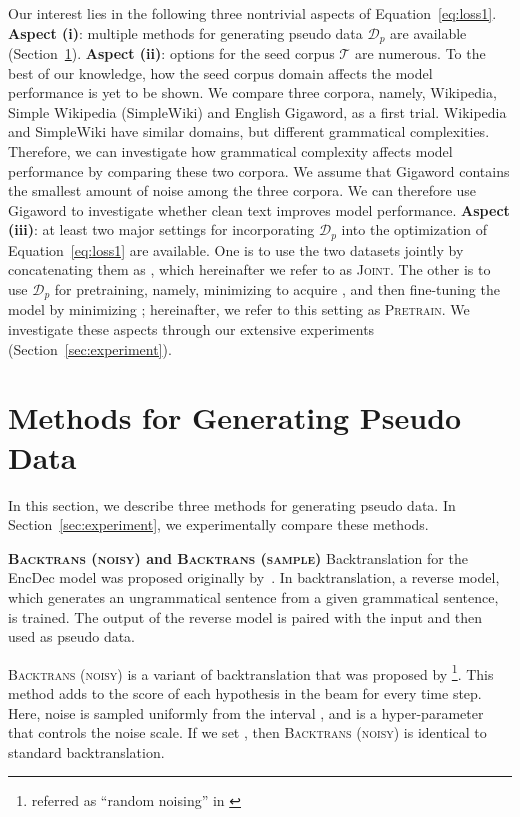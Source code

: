 \documentclass[11pt,a4paper]{article}
\newcommand{\backtrans}{\textsc{Backtrans (noisy)}}
\newcommand{\samplebacktrans}{\textsc{Backtrans (sample)}}
\newcommand{\joint}{\textsc{Joint}}
\newcommand{\pretrain}{\textsc{Pretrain}}
\newcommand{\pseudodata}{\ensuremath{\mathcal{D}_{p}}}
\newcommand{\seedcorpus}{\ensuremath{\mathcal{T}}}
\begin{document}
Our interest lies in the following three nontrivial aspects of Equation~\ref{eq:loss1}.
\textbf{Aspect (i)}: multiple methods for generating pseudo data \pseudodata{} are available (Section~\ref{sec:noising_methods}).
\textbf{Aspect (ii)}: options for the seed corpus \seedcorpus{} are numerous.
To the best of our knowledge, how the seed corpus domain affects the model performance is yet to be shown.
We compare three corpora, namely, Wikipedia, Simple Wikipedia (SimpleWiki) and English Gigaword, as a first trial.
Wikipedia and SimpleWiki have similar domains, but different grammatical complexities.
Therefore, we can investigate how grammatical complexity affects model performance by comparing these two corpora.
We assume that Gigaword contains the smallest amount of noise among the three corpora.
We can therefore use Gigaword to investigate whether clean text improves model performance.
\textbf{Aspect (iii)}: at least two major settings for incorporating \pseudodata{} into the optimization of Equation~\ref{eq:loss1} are available.
One is to use the two datasets jointly by concatenating them as , which hereinafter we refer to as \joint{}.
The other is to use \pseudodata{} for pretraining, namely, minimizing  to acquire , and then fine-tuning the model by minimizing ; hereinafter, we refer to this setting as \pretrain{}.
We investigate these aspects through our extensive experiments (Section~\ref{sec:experiment}).

\section{Methods for Generating Pseudo Data}
\label{sec:noising_methods}
In this section, we describe three methods for generating pseudo data.
In Section~\ref{sec:experiment}, we experimentally compare these methods. 

\noindent\textbf{\backtrans{} and \samplebacktrans{}}\hspace*{3mm} 
Backtranslation for the EncDec model was proposed originally by~\citet{sennrich:2016:backtrans}.
In backtranslation, a reverse model, which generates an ungrammatical sentence from a given grammatical sentence, is trained.
The output of the reverse model is paired with the input and then used as pseudo data.

\backtrans{} is a variant of backtranslation that was proposed by \citet{xie:2018:NAACL}\footnote{referred as ``random noising'' in \citet{xie:2018:NAACL}}.
This method adds  to the score of each hypothesis in the beam for every time step.
Here, noise  is sampled uniformly from the interval , and  is a hyper-parameter that controls the noise scale.
If we set , then \backtrans{} is identical to standard backtranslation.
\end{document}
